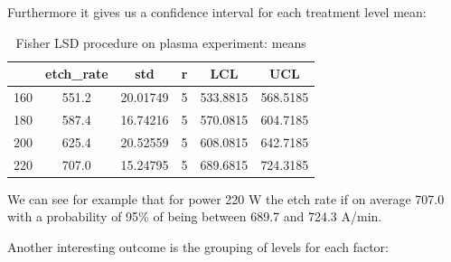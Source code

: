 \documentclass[
]{book}
\newenvironment{Shaded}{\begin{snugshade}}{\end{snugshade}}
\newcommand{\AttributeTok}[1]{\textcolor[rgb]{0.77,0.63,0.00}{#1}}
\newcommand{\CommentTok}[1]{\textcolor[rgb]{0.56,0.35,0.01}{\textit{#1}}}
\newcommand{\FunctionTok}[1]{\textcolor[rgb]{0.00,0.00,0.00}{#1}}
\newcommand{\NormalTok}[1]{#1}
\newcommand{\SpecialCharTok}[1]{\textcolor[rgb]{0.00,0.00,0.00}{#1}}
\newcommand{\StringTok}[1]{\textcolor[rgb]{0.31,0.60,0.02}{#1}}
\begin{document}
Furthermore it gives us a confidence interval for each treatment level mean:

\begin{Shaded}
\end{Shaded}

\begin{table}

\caption{\label{tab:tab-plasmafishermeans}Fisher LSD procedure on plasma experiment: means}
\centering
\begin{tabular}[t]{lccccc}
\toprule
  & etch\_rate & std & r & LCL & UCL\\
\midrule
160 & 551.2 & 20.01749 & 5 & 533.8815 & 568.5185\\
180 & 587.4 & 16.74216 & 5 & 570.0815 & 604.7185\\
200 & 625.4 & 20.52559 & 5 & 608.0815 & 642.7185\\
220 & 707.0 & 15.24795 & 5 & 689.6815 & 724.3185\\
\bottomrule
\end{tabular}
\end{table}

We can see for example that for power 220 W the etch rate if on average 707.0 with a probability of 95\% of being between 689.7 and 724.3 A/min.

Another interesting outcome is the grouping of levels for each factor:

\begin{Shaded}
\end{Shaded}
\end{document}
